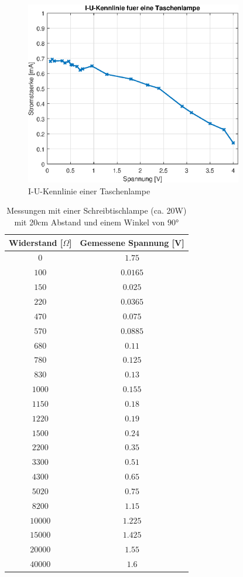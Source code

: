 \begin{figure}[htb]
\centering
\includegraphics[width=9.5cm]{pictures/I-U/Taschenlampe-UI.eps}
\caption{I-U-Kennlinie einer Taschenlampe}
\label{fig:I_U_Taschenlampe}
\end{figure}

\clearpage
\begin{table}[htb]
\centering
\caption{Messungen mit einer Schreibtischlampe (ca. 20W) mit 20cm Abstand und einem Winkel von $\ang{90}$}
\label{Schreibtischlampe}
\begin{tabular}{cc}
\toprule
Widerstand [$\Omega$] & Gemessene Spannung [V]\\
\midrule
$0$ & $1.75$\\
$100$ & $0.0165$\\
$150$ & $0.025$\\
$220$ & $0.0365$\\
$470$ & $0.075$\\
$570$ & $0.0885$\\
$680$ & $0.11$\\
$780$ & $0.125$\\
$830$ & $0.13$\\
$1000$ & $0.155$\\
$1150$ & $0.18$\\
$1220$ & $0.19$\\
$1500$ & $0.24$\\
$2200$ & $0.35$\\
$3300$ & $0.51$\\
$4300$ & $0.65$\\
$5020$ & $0.75$\\
$8200$ & $1.15$\\
$10000$ & $1.225$\\
$15000$ & $1.425$\\
$20000$ & $1.55$\\
$40000$ & $1.6$\\
\bottomrule
\end{tabular}
\end{table}

